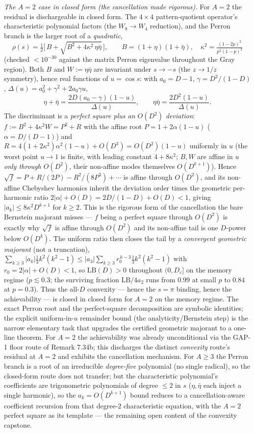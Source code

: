 \documentclass[
]{article}
\begin{document}
\emph{The $A=2$ case in closed form (the cancellation made rigorous).} For $A=2$
the residual is dischargeable in closed form. The $4\times4$ pattern-quotient
operator's characteristic polynomial factors (the $W_8\to W_4$ reduction), and the
Perron branch is the larger root of a \emph{quadratic},
\[
  \rho(s)=\tfrac12\bigl[\,B+\sqrt{B^2+4\kappa^2\,\eta\bar\eta}\,\bigr],\qquad
  B=(1+\eta)(1+\bar\eta),\quad \kappa^2=\tfrac{(1-2p)^2}{p^2(1-p)^2}
\]
(checked $<10^{-30}$ against the matrix Perron eigenvalue throughout the Gray
region). Both $B$ and $W:=\eta\bar\eta$ are invariant under $s\to-s$ (the
$z\to1/z$ symmetry), hence real functions of $u=\cos s$: with $a_0=D-1$,
$\gamma=D^2/(1-D)$, $\Delta(u)=a_0^2+\gamma^2+2a_0\gamma u$,
\[
  \eta+\bar\eta=\frac{2D(a_0-\gamma)(1-u)}{\Delta(u)},\qquad
  \eta\bar\eta=\frac{2D^2(1-u)}{\Delta(u)} .
\]
The discriminant is a \emph{perfect square plus an $O(D^2)$ deviation}:
$f:=B^2+4\kappa^2 W=P^2+R$ with the affine root $P=1+2\alpha(1-u)$
($\alpha=D/(D-1)$) and $R=4(1{+}2\kappa^2)\alpha^2(1-u)+O(D^3)=O(D^2)(1-u)$
uniformly in $u$ (the worst point $u\to1$ is finite, with leading constant
$4+8\kappa^2$; $B,W$ are affine in $u$ \emph{only through $O(D^2)$}, their
non-affine modes themselves $O(D^{k+1})$). Hence
$\sqrt f=P+R/(2P)-R^2/(8P^3)+\cdots$ is affine through $O(D^2)$, and its non-affine
Chebyshev harmonics inherit the deviation order times the geometric per-harmonic
ratio $2|\alpha|+O(D)=2D/(1-D)+O(D)<1$, giving $|a_k|\le 8\kappa^2 D^{k+1}$ for
$k\ge2$. This is the rigorous form of the cancellation the bare Bernstein
majorant misses --- $f$ being a perfect square through $O(D^2)$ is exactly why
$\sqrt f$ is affine through $O(D^2)$ and its non-affine tail is one $D$-power
below $O(D^k)$. The uniform ratio then closes the tail by a \emph{convergent
geometric majorant} (not a truncation),
$\sum_{k\ge3}|a_k|\tfrac13 k^2(k^2-1)\le|a_3|\sum_{k\ge3}r_0^{\,k-3}\tfrac13
k^2(k^2-1)$ with $r_0=2|\alpha|+O(D)<1$, so $\mathrm{LB}(D)>0$ throughout
$(0,D_c]$ on the memory regime ($p\lesssim0.3$; the surviving fraction
$\mathrm{LB}/4a_2$ runs from $0.99$ at small $p$ to $0.84$ at $p=0.3$). Thus the
all-$D$ convexity --- hence the $s=\pi$ binding, hence the achievability --- is
closed in closed form for $A=2$ on the memory regime. The exact Perron root and
the perfect-square decomposition are symbolic identities; the explicit
uniform-in-$u$ remainder bound (the analyticity/Bernstein step) is the narrow
elementary task that upgrades the certified geometric majorant to a one-line
theorem. For $A=2$ the achievability was already unconditional via the GAP-1
floor route of Remark 7.34b; this discharges the distinct \emph{convexity}
route's residual at $A=2$ and exhibits the cancellation mechanism. For $A\ge3$
the Perron branch is a root of an irreducible \emph{degree-five} polynomial (no
single radical), so the closed-form route does not transfer; but the
characteristic polynomial's coefficients are trigonometric polynomials of degree
$\le2$ in $s$ ($\eta,\bar\eta$ each inject a single harmonic), so the
$a_k=O(D^{k+1})$ bound reduces to a cancellation-aware coefficient recursion from
that degree-2 characteristic equation, with the $A=2$ perfect square as its
template --- the remaining open content of the convexity capstone.
\end{document}
